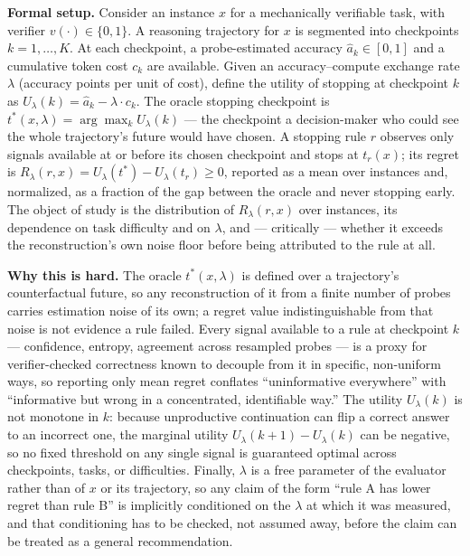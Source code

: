 \documentclass[11pt]{article}
\begin{document}
\noindent\textbf{Formal setup.} Consider an instance $x$ for a mechanically verifiable task, with verifier $v(\cdot) \in \{0,1\}$. A reasoning trajectory for $x$ is segmented into checkpoints $k = 1, \dots, K$. At each checkpoint, a probe-estimated accuracy $\hat{a}_k \in [0,1]$ and a cumulative token cost $c_k$ are available. Given an accuracy--compute exchange rate $\lambda$ (accuracy points per unit of cost), define the utility of stopping at checkpoint $k$ as $U_\lambda(k) = \hat{a}_k - \lambda \cdot c_k$. The oracle stopping checkpoint is $t^*(x, \lambda) = \arg\max_k U_\lambda(k)$ --- the checkpoint a decision-maker who could see the whole trajectory's future would have chosen. A stopping rule $r$ observes only signals available at or before its chosen checkpoint and stops at $t_r(x)$; its regret is $R_\lambda(r, x) = U_\lambda(t^*) - U_\lambda(t_r) \geq 0$, reported as a mean over instances and, normalized, as a fraction of the gap between the oracle and never stopping early. The object of study is the distribution of $R_\lambda(r, x)$ over instances, its dependence on task difficulty and on $\lambda$, and --- critically --- whether it exceeds the reconstruction's own noise floor before being attributed to the rule at all.

\noindent\textbf{Why this is hard.} The oracle $t^*(x, \lambda)$ is defined over a trajectory's counterfactual future, so any reconstruction of it from a finite number of probes carries estimation noise of its own; a regret value indistinguishable from that noise is not evidence a rule failed. Every signal available to a rule at checkpoint $k$ --- confidence, entropy, agreement across resampled probes --- is a proxy for verifier-checked correctness known to decouple from it in specific, non-uniform ways, so reporting only mean regret conflates ``uninformative everywhere'' with ``informative but wrong in a concentrated, identifiable way.'' The utility $U_\lambda(k)$ is not monotone in $k$: because unproductive continuation can flip a correct answer to an incorrect one, the marginal utility $U_\lambda(k+1) - U_\lambda(k)$ can be negative, so no fixed threshold on any single signal is guaranteed optimal across checkpoints, tasks, or difficulties. Finally, $\lambda$ is a free parameter of the evaluator rather than of $x$ or its trajectory, so any claim of the form ``rule A has lower regret than rule B'' is implicitly conditioned on the $\lambda$ at which it was measured, and that conditioning has to be checked, not assumed away, before the claim can be treated as a general recommendation.
\end{document}
